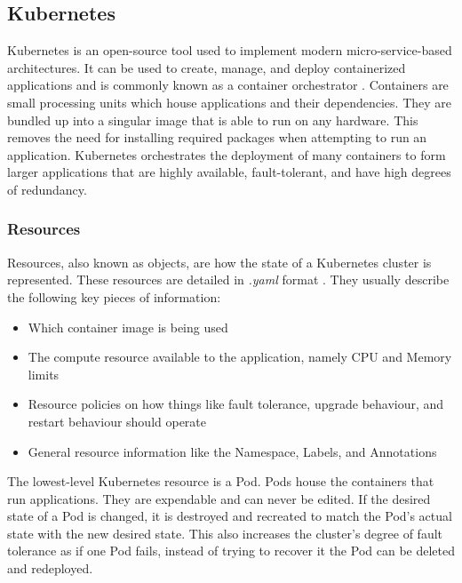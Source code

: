 \documentclass{article}
\begin{document}
\subsection{Kubernetes}

Kubernetes is an open-source tool used to implement modern micro-service-based architectures. It can be used to create, manage, and deploy containerized applications and is commonly known as a container orchestrator \cite{k8s-overview}. Containers are small processing units which house applications and their dependencies. They are bundled up into a singular image that is able to run on any hardware. This removes the need for installing required packages when attempting to run an application. Kubernetes orchestrates the deployment of many containers to form larger applications that are highly available, fault-tolerant, and have high degrees of redundancy.


\subsubsection{Resources} \label{resources}

Resources, also known as objects, are how the state of a Kubernetes cluster is represented. These resources are detailed in \emph{.yaml} format \cite{k8s-obj}. They usually describe the following key pieces of information:

\begin{itemize}
    \itemsep0em 
    \item Which container image is being used
    \item The compute resource available to the application, namely CPU and Memory limits
    \item Resource policies on how things like fault tolerance, upgrade behaviour, and restart behaviour should operate
    \item General resource information like the Namespace, Labels, and Annotations
\end{itemize}

The lowest-level Kubernetes resource is a Pod. Pods house the containers that run applications. They are expendable and can never be edited. If the desired state of a Pod is changed, it is destroyed and recreated to match the Pod's actual state with the new desired state. This also increases the cluster's degree of fault tolerance as if one Pod fails, instead of trying to recover it the Pod can be deleted and redeployed. 
\end{document}
